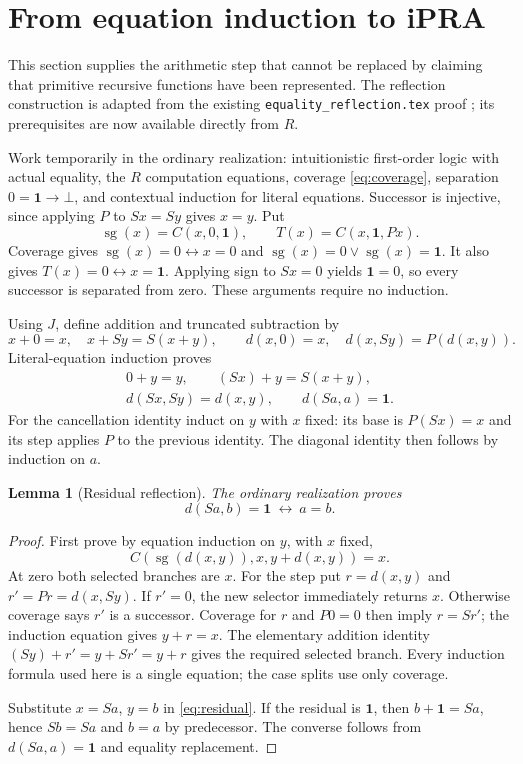 \documentclass[11pt,letterpaper]{article}
\newtheorem{lemma}[theorem]{Lemma}
\theoremstyle{definition}\newtheorem{definition}[theorem]{Definition}
\theoremstyle{remark}\newtheorem{remark}[theorem]{Remark}
\newcommand{\one}{\mathbf1}
\begin{document}
\section{From equation induction to iPRA}\label{sec:qfi}

This section supplies the arithmetic step that cannot be replaced by
claiming that primitive recursive functions have been represented.
The reflection construction is adapted from the existing
\texttt{equality\_reflection.tex} proof \cite{reflection}; its
prerequisites are now available directly from $R$.

Work temporarily in the ordinary realization: intuitionistic
first-order logic with actual equality, the $R$ computation equations,
coverage \eqref{eq:coverage}, separation $0=\one\to\bot$, and
contextual induction for literal equations. Successor is injective,
since applying $P$ to $Sx=Sy$ gives $x=y$. Put
\[
 \operatorname{sg}(x)=C(x,0,\one),\qquad
 T(x)=C(x,\one,Px).
\]
Coverage gives
$\operatorname{sg}(x)=0\leftrightarrow x=0$ and
$\operatorname{sg}(x)=0\lor\operatorname{sg}(x)=\one$.
It also gives $T(x)=0\leftrightarrow x=\one$.
Applying sign to $Sx=0$ yields $\one=0$, so every successor is
separated from zero. These arguments require no induction.

Using $J$, define addition and truncated subtraction by
\[
 x+0=x,\quad x+Sy=S(x+y),\qquad
 d(x,0)=x,\quad d(x,Sy)=P(d(x,y)).
\]
Literal-equation induction proves
\begin{gather*}
 0+y=y,\qquad (Sx)+y=S(x+y),\\
 d(Sx,Sy)=d(x,y),\qquad d(Sa,a)=\one.
\end{gather*}
For the cancellation identity induct on $y$ with $x$ fixed: its
base is $P(Sx)=x$ and its step applies $P$ to the previous
identity. The diagonal identity then follows by induction on $a$.

\begin{lemma}[Residual reflection]\label{lem:reflection}
The ordinary realization proves
\[
 d(Sa,b)=\one\ \leftrightarrow\ a=b.
\]
\end{lemma}
\begin{proof}
First prove by equation induction on $y$, with $x$ fixed,
\begin{equation}\label{eq:residual}
 C(\operatorname{sg}(d(x,y)),x,y+d(x,y))=x.
\end{equation}
At zero both selected branches are $x$. For the step put
$r=d(x,y)$ and $r'=Pr=d(x,Sy)$. If $r'=0$, the new selector
immediately returns $x$. Otherwise coverage says $r'$ is a
successor. Coverage for $r$ and $P0=0$ then imply $r=Sr'$;
the induction equation gives $y+r=x$. The elementary addition
identity $(Sy)+r'=y+Sr'=y+r$ gives the required selected
branch. Every induction formula used here is a single equation;
the case splits use only coverage.

Substitute $x=Sa$, $y=b$ in \eqref{eq:residual}. If the
residual is $\one$, then $b+\one=Sa$, hence $Sb=Sa$ and
$b=a$ by predecessor. The converse follows from
$d(Sa,a)=\one$ and equality replacement.
\end{proof}
\end{document}
